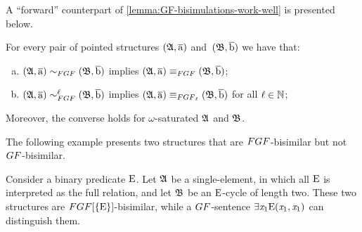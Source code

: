 A ``forward'' counterpart of \cref{lemma:GF-bisimulations-work-well} is presented below.
\begin{lemma}\label{lem:FGF-bisimulations-work-well}
For every pair of pointed structures $({\mathfrak{A}}, \overline{\mathrm{a}})$ and~$({\mathfrak{B}}, \overline{\mathrm{b}})$ we have that:
\begin{enumerate}[(a)]
\item $(\str{A}, \elemtuplea) \bisimto_{\FGF} (\str{B}, \elemtupleb)$ implies $(\str{A}, \elemtuplea) \equiv_{\FGF} (\str{B}, \elemtupleb)$;
\item $(\str{A}, \elemtuplea) \bisimto_{\FGF}^{\ell} (\str{B}, \elemtupleb)$ implies $(\str{A}, \elemtuplea) \equiv_{\FGF_\ell} (\str{B}, \elemtupleb)$ for all $\ell \in {\mathbb{N}}$;
\end{enumerate}
Moreover, the converse holds for $\omega$-saturated ${\mathfrak{A}}$ and ${\mathfrak{B}}$.
\end{lemma}


The following example presents two structures that are $\FGF$-bisimilar but not $\GF$-bisimilar.
\begin{example} 
Consider a binary predicate $\mathrm{E}$.
Let ${\mathfrak{A}}$ be a single-element, in which all $\mathrm{E}$ is interpreted as the full relation, and let ${\mathfrak{B}}$ be an $\mathrm{E}$-cycle of length two. These two structures are $\FGF[\{\relE\}]$-bisimilar, while a $\GF$-sentence $\exists{\mathit{x}_1}\mathrm{E}(\mathit{x}_1,\mathit{x}_1)$ can distinguish them.
\end{example}

